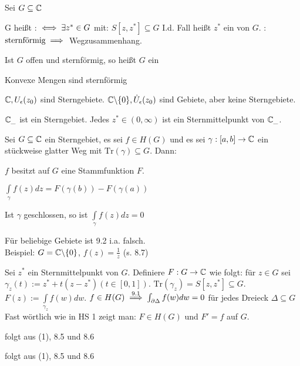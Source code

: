 \documentclass[a4paper,twoside,DIV15,BCOR12mm]{scrbook}
\def\gdw{\equizu}
\def\Tr{\text{Tr}}
\def\wegint{\ensuremath{\int\limits_\gamma}}
\def\gdw{\equizu}
\begin{document}
\begin{definition}
Sei $G \subseteq \mathbb{C}$
\begin{liste}
\item G heißt  : $\gdw \exists z^* \in G$ mit: $S[z,z^*] \subseteq G$
I.d. Fall heißt $z^*$ ein  von $G$.\newline
{}: $\text{sternförmig} \implies$ Wegzusammenhang.
\item Ist $G$ offen und sternförmig, so heißt $G$ ein 
\end{liste}
\end{definition}

\begin{beispiel}
\begin{liste}
\item Konvexe Mengen sind sternförmig
\item $\mathbb{C}, U_{\epsilon}(z_0)$ sind Sterngebiete. $\mathbb{C}\backslash\{0\}, \dot U_{\epsilon}(z_0)$ sind Gebiete, aber keine Sterngebiete.
\item $\mathbb{C}_{\_}$ ist ein Sterngebiet. Jedes $z^* \in (0,\infty)$ ist ein Sternmittelpunkt von $\mathbb{C}_{\_}$.
\end{liste}
\end{beispiel}
\begin{satz}
Sei $G \subseteq \mathbb{C}$ ein Sterngebiet, es sei $f \in H(G)$ und es sei $\gamma:[a,b] \rightarrow \mathbb{C}$ ein stückweise glatter Weg mit $\Tr (\gamma) \subseteq G$. Dann:
\begin{liste}
\item $f$ besitzt auf $G$ eine Stammfunktion $F$.
\item $\wegint f(z) dz = F(\gamma(b))-F(\gamma(a))$
\item Ist $\gamma$ geschlossen, so ist $\wegint f(z) dz = 0$
\end{liste}
\end{satz}
\begin{bemerkung}
Für beliebige Gebiete ist 9.2 i.a. falsch. \\
Beispiel: $G = \mathbb{C}\backslash\{0\}$, $f(z) = \frac{1}{z}$ (s. 8.7)
\end{bemerkung}

\begin{beweis}
\begin{liste}
\item Sei $z^*$ ein Sternmittelpunkt von $G$. Definiere $F : G \to \mathbb{C}$ wie folgt:
für $z \in G$ sei $\gamma_z (t) := z^* + t (z-z^*) (t \in [0,1])$.
$\Tr(\gamma_z) = S[z,z^*] \subseteq G$. $F(z) := \int\limits_{\gamma _z} f(w) dw$.
$f \in H(G) \stackrel{9.1}{\implies} \int_{\partial \Delta} f(w) dw = 0$ für jedes Dreieck $\Delta \subseteq G$
Fast wörtlich wie in HS 1 zeigt man: $F \in H(G)$ und $F'=f$ auf $G$.
\item folgt aus (1), 8.5 und 8.6
\item folgt aus (1), 8.5 und 8.6
\end{liste}
\end{beweis}
\end{document}
